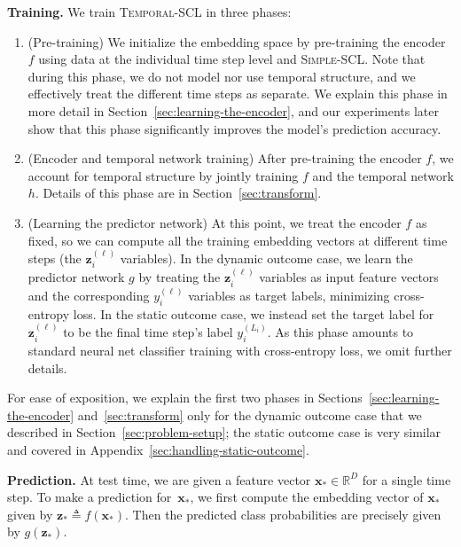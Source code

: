 \documentclass[pmlr,twocolumn,10pt]{jmlr} %
\begin{document}
\noindent
\textbf{Training.}
We train \textsc{Temporal-SCL} in three phases:
\begin{enumerate}[leftmargin=*,itemsep=0pt,parsep=0pt,topsep=2pt]

\item (Pre-training) We initialize the embedding space by pre-training the encoder~$f$ using data at the individual time step level and \mbox{\textsc{Simple-SCL}}. 
Note that during this phase, we do not model nor use temporal structure, and we effectively treat the different time steps as separate. We explain this phase in more detail in Section~\ref{sec:learning-the-encoder}, and our experiments later show that this phase significantly improves the model's prediction accuracy.

\item (Encoder and temporal network training) After pre-training the encoder $f$, we account for temporal structure by jointly training $f$ and the temporal network $h$. Details of this phase are in Section~\ref{sec:transform}.

\item (Learning the predictor network) At this point, we treat the encoder $f$ as fixed, so we can compute all the training embedding vectors at different time steps (the $\mathbf{z}_i^{(\ell)}$ variables). In the dynamic outcome case, we learn the predictor network $g$ by treating the $\mathbf{z}_i^{(\ell)}$ variables as input feature vectors and the corresponding $y_i^{(\ell)}$ variables as target labels, minimizing cross-entropy loss. In the static outcome case, we instead set the target label for $\mathbf{z}_i^{(\ell)}$ to be the final time step's label $y_i^{(L_i)}$. As this phase amounts to standard neural net classifier training with cross-entropy loss, we omit further details.

\end{enumerate}
For ease of exposition, we explain the first two phases in Sections~\ref{sec:learning-the-encoder} and~\ref{sec:transform} only for the dynamic outcome case that we described in Section~\ref{sec:problem-setup}; the static outcome case is very similar and covered in Appendix~\ref{sec:handling-static-outcome}.

\vspace{.2em}
\noindent
\textbf{Prediction.}
At test time, we are given a feature vector $\mathbf{x}_*\in\mathbb{R}^{D}$ for a single time step. To make a prediction for~$\mathbf{x}_*$, we first compute the embedding vector of $\mathbf{x}_*$ given by $\mathbf{z}_* \triangleq  f(\mathbf{x}_*)$. Then the predicted class probabilities are precisely given by $g(\mathbf{z}_*)$.
\end{document}
